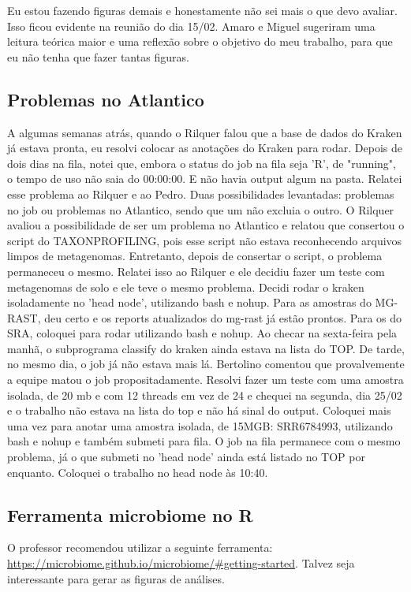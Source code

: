 \documentclass[12pt, a4paper]{report}
\begin{document}
Eu estou fazendo figuras demais e honestamente não sei mais o que devo avaliar. Isso ficou evidente na reunião do dia 15/02. Amaro e Miguel sugeriram uma leitura teórica maior e uma reflexão sobre o objetivo do meu trabalho, para que eu não tenha que fazer tantas figuras. 

\subsection{Problemas no Atlantico}
A algumas semanas atrás, quando o Rilquer falou que a base de dados do Kraken já estava pronta, eu resolvi colocar as anotações do Kraken para rodar. Depois de dois dias na fila, notei que, embora o status do job na fila seja 'R', de "running", o tempo de uso não saia do 00:00:00. E não havia output algum na pasta. Relatei esse problema ao Rilquer e ao Pedro. Duas possibilidades levantadas: problemas no job ou problemas no Atlantico, sendo que um não excluia o outro. O Rilquer avaliou a possibilidade de ser um problema no Atlantico e relatou que consertou o script do TAXONPROFILING, pois esse script não estava reconhecendo arquivos limpos de metagenomas. Entretanto, depois de consertar o script, o problema permaneceu o mesmo. Relatei isso ao Rilquer e ele decidiu fazer um teste com metagenomas de solo e ele teve o mesmo problema. Decidi rodar o kraken isoladamente no 'head node', utilizando bash e nohup. Para as amostras do MG-RAST, deu certo e os reports atualizados do mg-rast já estão prontos. Para os do SRA, coloquei para rodar utilizando bash e nohup. Ao checar na sexta-feira pela manhã, o subprograma classify do kraken ainda estava na lista do TOP. De tarde, no mesmo dia, o job já não estava mais lá. Bertolino comentou que provalvemente a equipe matou o job propositadamente. Resolvi fazer um teste com uma amostra isolada, de 20 mb e com 12 threads em vez de 24 e chequei na segunda, dia 25/02 e o trabalho não estava na lista do top e não há sinal do output. Coloquei mais uma vez para anotar uma amostra isolada, de 15MGB: SRR6784993, utilizando bash e nohup e também submeti para fila. O job na fila permanece com o mesmo problema, já o que submeti no 'head node' ainda está listado no TOP por enquanto. Coloquei o trabalho no head node às 10:40. 



\subsection{Ferramenta microbiome no R}
O professor recomendou utilizar a seguinte ferramenta: \url{https://microbiome.github.io/microbiome/#getting-started}. Talvez seja interessante para gerar as figuras de análises.
\end{document}
